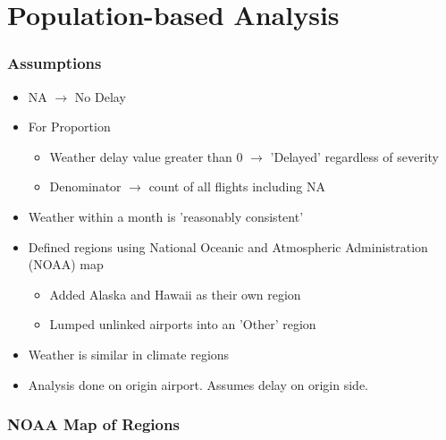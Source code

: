 \documentclass{beamer}
\begin{document}
\section{Population-based Analysis}
\begin{frame}
\frametitle{Assumptions} 
\begin{itemize}
\item NA $\rightarrow$ No Delay

\item For Proportion
\begin{itemize}
\item Weather delay value greater than 0 $\rightarrow$ 'Delayed' regardless of severity 
\item Denominator $\rightarrow$ count of all flights including NA
\end{itemize}

\item Weather within a month is 'reasonably consistent'

\item Defined regions using National Oceanic and Atmospheric Administration (NOAA) map
\begin{itemize}
\item Added Alaska and Hawaii as their own region
\item Lumped unlinked airports into an 'Other' region
\end{itemize}

\item Weather is similar in climate regions

\item Analysis done on origin airport. Assumes delay on origin side.

\end{itemize}
\end{frame}





\begin{frame}
\frametitle{NOAA Map of Regions}
\begin{center}
\end{center}
\end{frame}
\end{document}
